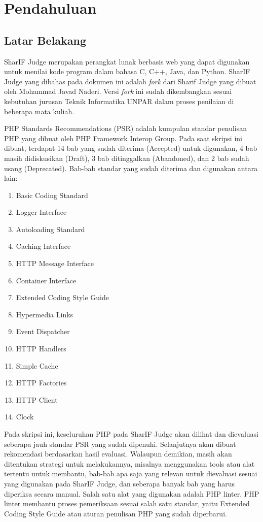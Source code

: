 \chapter{Pendahuluan}
\label{chap:intro}
   
\section{Latar Belakang}
\label{sec:label}

SharIF Judge merupakan perangkat lunak berbasis web yang dapat digunakan untuk menilai kode program dalam bahasa C, C++, Java, dan Python. SharIF Judge yang dibahas pada dokumen ini adalah \textit{fork} dari Sharif Judge yang dibuat oleh Mohammad Javad Naderi. Versi \textit{fork} ini sudah dikembangkan sesuai kebutuhan jurusan Teknik Informatika UNPAR dalam proses penilaian di beberapa mata kuliah.

PHP Standards Recommendations (PSR) adalah kumpulan standar penulisan PHP yang dibuat oleh PHP Framework Interop Group. Pada saat skripsi ini dibuat, terdapat 14 bab yang sudah diterima (Accepted) untuk digunakan, 4 bab masih didiskusikan (Draft), 3 bab ditinggalkan (Abandoned), dan 2 bab sudah usang (Deprecated). Bab-bab standar yang sudah diterima dan digunakan antara lain: 
\begin {enumerate}
\item Basic Coding Standard
\item Logger Interface
\item Autoloading Standard
\item Caching Interface
\item HTTP Message Interface
\item Container Interface
\item Extended Coding Style Guide
\item Hypermedia Links
\item Event Dispatcher
\item HTTP Handlers
\item Simple Cache
\item HTTP Factories
\item HTTP Client
\item Clock
\end {enumerate}	

Pada skripsi ini, keseluruhan PHP pada SharIF Judge akan dilihat dan dievaluasi seberapa jauh standar PSR yang sudah dipenuhi. Selanjutnya akan dibuat rekomendasi berdasarkan hasil evaluasi. Walaupun demikian, masih akan ditentukan strategi untuk melakukannya, misalnya menggunakan tools atau alat tertentu untuk membantu, bab-bab apa saja yang relevan untuk dievaluasi sesuai yang digunakan pada SharIF Judge, dan seberapa banyak bab yang harus diperiksa secara manual. Salah satu alat yang digunakan adalah PHP linter. PHP linter membantu proses pemeriksaan sesuai salah satu standar, yaitu Extended Coding Style Guide atau aturan penulisan PHP yang sudah diperbarui. 

